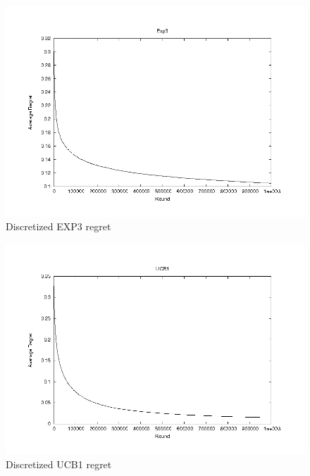 \documentclass{article}
\begin{document}
\begin{figure}[htb]
  \begin{center}
     \includegraphics[width=\figwidth]{images/exp3.png}
     \caption{Discretized EXP3 regret}
     \label{fig:exp3}
  \end{center}
\end{figure}

\begin{figure}[htb]
  \begin{center}
     \includegraphics[width=\figwidth]{images/ucb1.png}
     \caption{Discretized UCB1 regret}
     \label{fig:ucb1}
  \end{center}
\end{figure}
\end{document}
